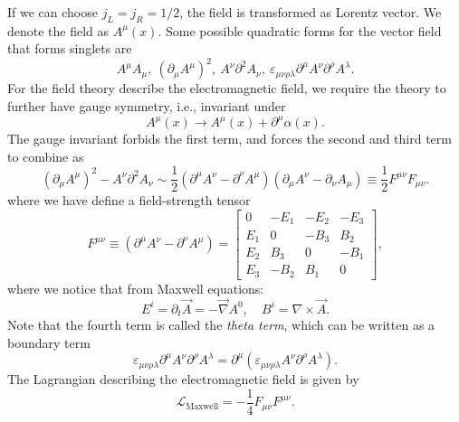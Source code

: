 If we can choose $j_L=j_R=1/2$, the field is transformed as Lorentz vector.
We denote the field as $A^\mu(x)$.
Some possible quadratic forms for the vector field that forms singlets are
\begin{equation*}
	A^\mu A_\mu,\ (\partial_\mu A^\mu)^2,\ A^\nu \partial^2 A_\nu,\ 
	\varepsilon_{\mu\nu\rho\lambda} \partial^\mu A^\nu \partial^\rho A^\lambda.
\end{equation*}
For the field theory describe the electromagnetic field, we require the theory to further have gauge symmetry, i.e., invariant under
\begin{equation}
	A^\mu(x) \rightarrow A^\mu(x) + \partial^\mu \alpha(x).
\end{equation}
The gauge invariant forbids the first term, and forces the second and third term to combine as
\begin{equation*}
	(\partial_\mu A^\mu)^2 - A^\nu \partial^2 A_\nu
	\sim \frac{1}{2}(\partial^\mu A^\nu - \partial^\nu A^\mu)(\partial_\mu A^\nu-\partial_\nu A_\mu)
	\equiv \frac{1}{2} F^{\mu\nu}F_{\mu\nu}.
\end{equation*}
where we have define a field-strength tensor
\begin{equation}
	F^{\mu\nu}\equiv (\partial^\mu A^\nu - \partial^\nu A^\mu)
	= \left[\begin{array}{cccc}
		0 & -E_1 & -E_2 & -E_3 \\
		E_1 & 0 & -B_3 & B_2 \\
		E_2 & B_3 & 0 & -B_1 \\
		E_3 & -B_2 & B_1 & 0
	\end{array} \right],
\end{equation}
where we notice that from Maxwell equations:
\begin{equation}
	E^i = \partial_t \vec A = -\vec\nabla A^0, \quad B^i = \nabla \times \vec A.
\end{equation}
Note that the fourth term is called the \textit{theta term}, which can be written as a boundary term
\begin{equation*}
	\varepsilon_{\mu\nu\rho\lambda} \partial^\mu A^\nu \partial^\rho A^\lambda
	= \partial^\mu (\varepsilon_{\mu\nu\rho\lambda} A^\nu \partial^\rho A^\lambda).
\end{equation*}
The Lagrangian describing the electromagnetic field is given by
\begin{equation}
	\mathcal{L}_{\mathrm{Maxwell}} = -\frac{1}{4}F_{\mu\nu}F^{\mu\nu}.
\end{equation}



